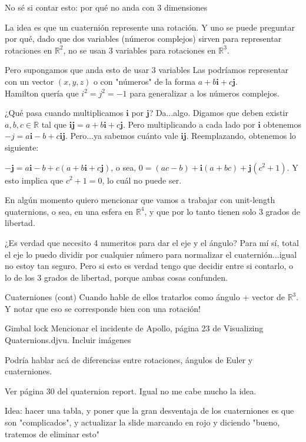 \documentclass[10pt]{beamer}
\def\R{\mathbb{R}}
\def\ii{\textbf{i}}
\def\jj{\textbf{j}}
\begin{document}
\begin{frame}{No sé si contar esto: por qué no anda con 3 dimensiones}

La idea es que un cuaternión represente una rotación. Y uno se puede preguntar por qué, dado que dos variables (números complejos) sirven para representar rotaciones en $\R^2$, no se usan 3 variables para rotaciones en $\R^3$.


Pero supongamos que anda esto de usar 3 variables  Las podríamos representar con un vector $(x,y,z)$ o con "números" de la forma $a+b\ii+c\jj$. \\

Hamilton quería que $i^2=j^2=-1$ para generalizar a los números complejos.


¿Qué pasa cuando multiplicamos $\ii$ por $\jj$? Da...algo. Digamos que deben existir $a,b,c\in\R$ tal que $\ii\jj=a+b\ii+c\jj$. Pero multiplicando a cada lado por $\ii$ obtenemos $-j = a\ii-b+c\ii\jj$. Pero...ya sabemos cuánto vale $\ii\jj$. Reemplazando, obtenemos lo siguiente:

$-\jj=a\ii-b+c(a+b\ii+c\jj)$, o sea, $0=(ac-b)+\ii(a+bc)+\jj(c^2+1)$. Y esto implica que $c^2+1 = 0$, lo cuál no puede ser.


\end{frame}

\begin{frame}
	En algún momento quiero mencionar que vamos a trabajar con unit-length quaternions, o sea, en una esfera en $\R^4$, y que por lo tanto tienen solo 3 grados de libertad.
	
	¿Es verdad que necesito 4 numeritos para dar el eje y el ángulo? Para mí sí, total el eje lo puedo dividir por cualquier número para normalizar el cuaternión...igual no estoy tan seguro. Pero si esto es verdad tengo que decidir entre si contarlo, o lo de los 3 grados de libertad, porque ambas cosas confunden.
\end{frame}

\begin{frame}{Cuaterniones (cont)}
	Cuando hable de ellos tratarlos como ángulo + vector de $\R^3$. Y notar que eso se corresponde bien con una rotación!
\end{frame}


\begin{frame}{Gimbal lock}
Mencionar el incidente de Apollo, página 23 de Visualizing Quaternions.djvu. Incluir imágenes


\end{frame}

\begin{frame}
Podría hablar acá de diferencias entre rotaciones, ángulos de Euler y cuaterniones.

Ver página 30 del quaternion report. Igual no me cabe mucho la idea.

Idea: hacer una tabla, y poner que la gran desventaja de los cuaterniones es que son "complicados", y actualizar la slide marcando en rojo y diciendo "bueno, tratemos de eliminar esto"
\end{frame}

\fi
\end{document}
